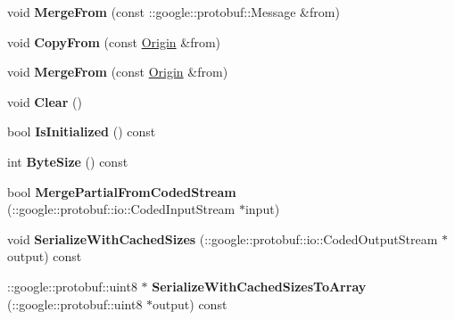 \begin{DoxyCompactItemize}
\item 
\hypertarget{classlattice_1_1Origin_a5b3e6ff8bfb6a4c8e0239774783066b6}{
void {\bfseries MergeFrom} (const ::google::protobuf::Message \&from)}
\label{classlattice_1_1Origin_a5b3e6ff8bfb6a4c8e0239774783066b6}

\item 
\hypertarget{classlattice_1_1Origin_aa91d3c50ddb13b51379510603a068958}{
void {\bfseries CopyFrom} (const \hyperlink{classlattice_1_1Origin}{Origin} \&from)}
\label{classlattice_1_1Origin_aa91d3c50ddb13b51379510603a068958}

\item 
\hypertarget{classlattice_1_1Origin_a3faee262511eec654f7a0632a5e560ba}{
void {\bfseries MergeFrom} (const \hyperlink{classlattice_1_1Origin}{Origin} \&from)}
\label{classlattice_1_1Origin_a3faee262511eec654f7a0632a5e560ba}

\item 
\hypertarget{classlattice_1_1Origin_a90a1a2c78ec1f709cbb0b168fd9aa817}{
void {\bfseries Clear} ()}
\label{classlattice_1_1Origin_a90a1a2c78ec1f709cbb0b168fd9aa817}

\item 
\hypertarget{classlattice_1_1Origin_a62f1d2f32a1eaa899ad85610f1db8fe4}{
bool {\bfseries IsInitialized} () const }
\label{classlattice_1_1Origin_a62f1d2f32a1eaa899ad85610f1db8fe4}

\item 
\hypertarget{classlattice_1_1Origin_af83bae786f9add99760ee4935a135443}{
int {\bfseries ByteSize} () const }
\label{classlattice_1_1Origin_af83bae786f9add99760ee4935a135443}

\item 
\hypertarget{classlattice_1_1Origin_aa13a6b6f63ac1ea4c310f04348a8575f}{
bool {\bfseries MergePartialFromCodedStream} (::google::protobuf::io::CodedInputStream $\ast$input)}
\label{classlattice_1_1Origin_aa13a6b6f63ac1ea4c310f04348a8575f}

\item 
\hypertarget{classlattice_1_1Origin_ae2b055eae68d73af19bcda59c6b15ac6}{
void {\bfseries SerializeWithCachedSizes} (::google::protobuf::io::CodedOutputStream $\ast$output) const }
\label{classlattice_1_1Origin_ae2b055eae68d73af19bcda59c6b15ac6}

\item 
\hypertarget{classlattice_1_1Origin_a801d7179a6e85e2fbd1113ea82f9a440}{
::google::protobuf::uint8 $\ast$ {\bfseries SerializeWithCachedSizesToArray} (::google::protobuf::uint8 $\ast$output) const }
\label{classlattice_1_1Origin_a801d7179a6e85e2fbd1113ea82f9a440}


\end{DoxyCompactItemize}
